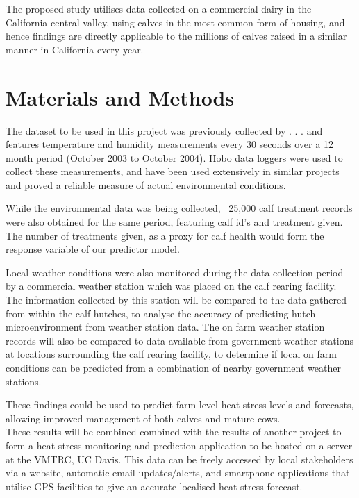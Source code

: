 \documentclass[12pt]{article}
\begin{document}
	The proposed study  utilises data collected on a commercial dairy in the California central valley, using calves in the most common form of housing, and hence findings are directly applicable to the millions of calves raised in a similar manner in California every year. %

	\newpage
	\section{Materials and Methods}
		The dataset to be used in this project was previously collected by . . .  %
		and features temperature and humidity measurements every 30 seconds over a 12 month period (October 2003 to October 2004). 
		Hobo data loggers\cite{Onset2012} were used to collect these measurements, and have been used extensively in similar projects and proved a reliable measure of actual environmental conditions\cite{Scharf2011,Jousan2007}.


		While the environmental data was being collected, ~25,000 calf treatment records were also obtained for the same period, featuring calf id's and treatment given. 
		The number of treatments given, as a proxy for calf health would form the response variable of our predictor model. %


		Local weather conditions were also monitored during the data collection period by a commercial weather station which was placed on the calf rearing facility. The information collected by this station will be compared to the data gathered from within the calf hutches, to analyse the accuracy of predicting hutch microenvironment from weather station data. 
		The on farm weather station records will also be compared to data available from government weather stations at locations surrounding the calf rearing facility\cite{NOAA2012}, to determine if local on farm conditions can be predicted from a combination of nearby government weather stations. 


		These findings could be used to predict farm-level heat stress levels and forecasts, allowing improved management of both calves and mature cows.\\
		These results will be combined combined with the results of another project %
		to form a heat stress monitoring and prediction application to be hosted on a server at the VMTRC, UC Davis. 
		This data can be freely accessed by local stakeholders via a website, automatic email updates/alerts, and smartphone applications that utilise GPS facilities to give an accurate localised heat stress forecast.


	\newpage
	
	
\end{document}
